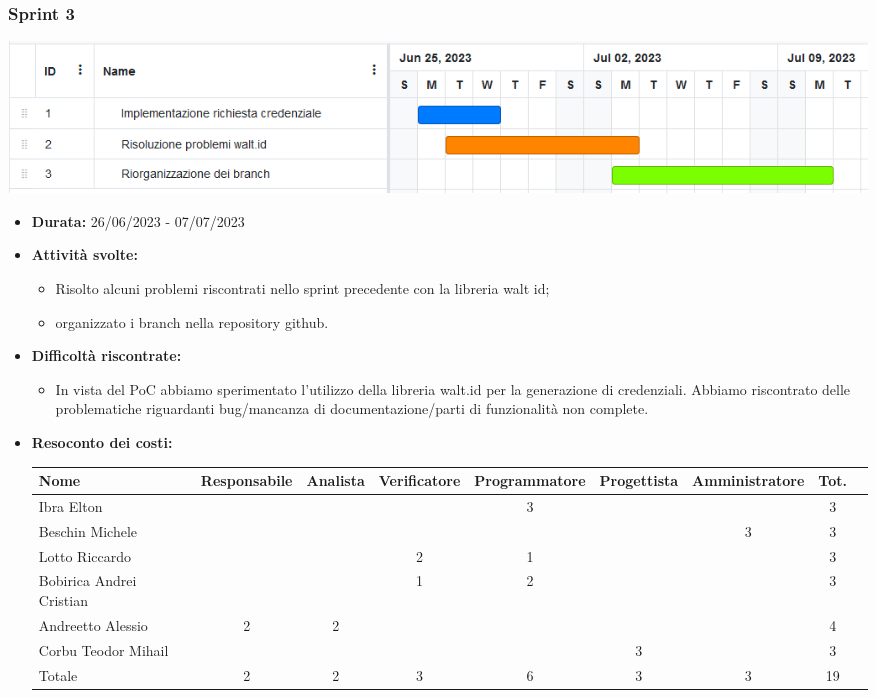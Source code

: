 \subsubsection{Sprint 3}
\begin{center}
    \includegraphics[scale = 0.5]{./res/img/Sprint_3.png}
  \end{center}
\begin{itemize}
    \item \textbf{Durata:} 26/06/2023 - 07/07/2023 
    \item \textbf{Attività svolte:}
    \begin{itemize}
        \item Risolto alcuni problemi riscontrati nello sprint precedente con la libreria walt id;
        \item organizzato i branch nella repository github.
    \end{itemize}
    \item \textbf{Difficoltà riscontrate:}
    \begin{itemize}
        \item In vista del PoC abbiamo sperimentato l’utilizzo della libreria walt.id per la generazione di credenziali.
        Abbiamo riscontrato delle problematiche riguardanti bug/mancanza di documentazione/parti di funzionalità non complete.
    \end{itemize}
    \item \textbf{Resoconto dei costi:}
    \begin{longtable}{|p{}|c|c|c|c|c|c|c|c|}
        \hline
        Nome & Responsabile & Analista & Verificatore & Programmatore & Progettista & Amministratore & Tot.\\
        \hline
        Ibra Elton & & & &3 & & &3\\
        \hline
        Beschin Michele & & & & & &3 &3 \\
        \hline
        Lotto Riccardo & & &2 &1 & & &3 \\
        \hline
        Bobirica Andrei Cristian & & &1 &2 & & &3 \\
        \hline
        Andreetto Alessio &2 &2 & & & & &4 \\
        \hline
        Corbu Teodor Mihail & & & & &3 & &3 \\
        \hline
        Totale &2 &2 &3 &6 &3 &3 &19 \\
        \hline
    \end{longtable}
    \end{itemize}

